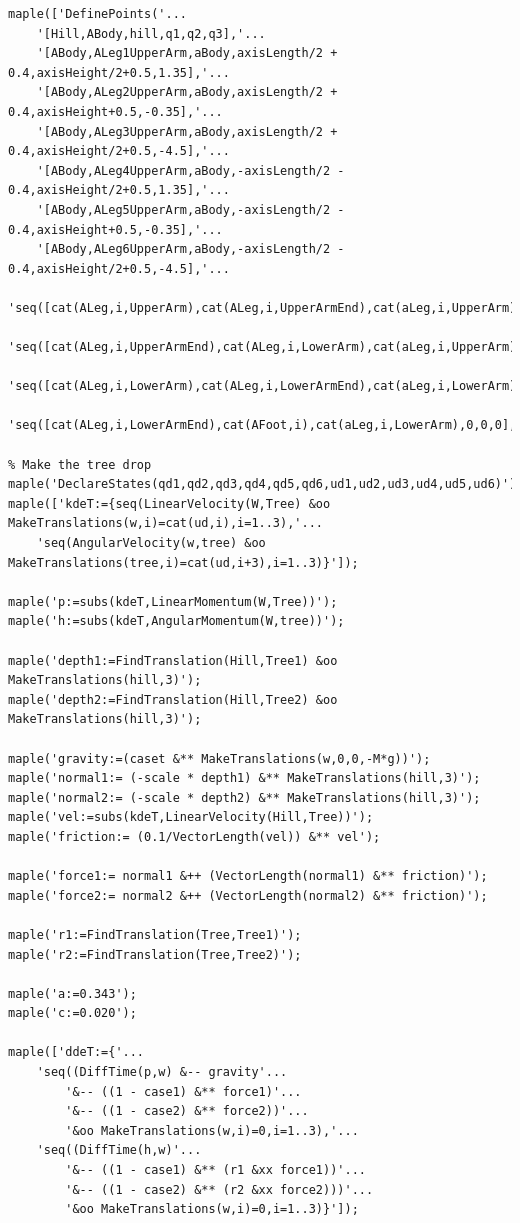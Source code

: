\documentclass{article}
\begin{document}
\begin{verbatim}
maple(['DefinePoints('...
	'[Hill,ABody,hill,q1,q2,q3],'...
	'[ABody,ALeg1UpperArm,aBody,axisLength/2 + 0.4,axisHeight/2+0.5,1.35],'...
	'[ABody,ALeg2UpperArm,aBody,axisLength/2 + 0.4,axisHeight+0.5,-0.35],'...
	'[ABody,ALeg3UpperArm,aBody,axisLength/2 + 0.4,axisHeight/2+0.5,-4.5],'...
	'[ABody,ALeg4UpperArm,aBody,-axisLength/2 - 0.4,axisHeight/2+0.5,1.35],'...
	'[ABody,ALeg5UpperArm,aBody,-axisLength/2 - 0.4,axisHeight+0.5,-0.35],'...
	'[ABody,ALeg6UpperArm,aBody,-axisLength/2 - 0.4,axisHeight/2+0.5,-4.5],'...
	'seq([cat(ALeg,i,UpperArm),cat(ALeg,i,UpperArmEnd),cat(aLeg,i,UpperArm),0,0,LengthUpperArm],i=1..6),'...
	'seq([cat(ALeg,i,UpperArmEnd),cat(ALeg,i,LowerArm),cat(aLeg,i,UpperArm),0,0,0],i=1..6),'...
	'seq([cat(ALeg,i,LowerArm),cat(ALeg,i,LowerArmEnd),cat(aLeg,i,LowerArm),0,0,LengthLowerArm],i=1..6),'...
	'seq([cat(ALeg,i,LowerArmEnd),cat(AFoot,i),cat(aLeg,i,LowerArm),0,0,0],i=1..6))']);

% Make the tree drop
maple('DeclareStates(qd1,qd2,qd3,qd4,qd5,qd6,ud1,ud2,ud3,ud4,ud5,ud6)');
maple(['kdeT:={seq(LinearVelocity(W,Tree) &oo MakeTranslations(w,i)=cat(ud,i),i=1..3),'...
    'seq(AngularVelocity(w,tree) &oo MakeTranslations(tree,i)=cat(ud,i+3),i=1..3)}']);

maple('p:=subs(kdeT,LinearMomentum(W,Tree))');
maple('h:=subs(kdeT,AngularMomentum(W,tree))');

maple('depth1:=FindTranslation(Hill,Tree1) &oo MakeTranslations(hill,3)');
maple('depth2:=FindTranslation(Hill,Tree2) &oo MakeTranslations(hill,3)');

maple('gravity:=(caset &** MakeTranslations(w,0,0,-M*g))');
maple('normal1:= (-scale * depth1) &** MakeTranslations(hill,3)');
maple('normal2:= (-scale * depth2) &** MakeTranslations(hill,3)');
maple('vel:=subs(kdeT,LinearVelocity(Hill,Tree))');
maple('friction:= (0.1/VectorLength(vel)) &** vel');

maple('force1:= normal1 &++ (VectorLength(normal1) &** friction)');
maple('force2:= normal2 &++ (VectorLength(normal2) &** friction)');

maple('r1:=FindTranslation(Tree,Tree1)');
maple('r2:=FindTranslation(Tree,Tree2)');

maple('a:=0.343');
maple('c:=0.020');

maple(['ddeT:={'...
    'seq((DiffTime(p,w) &-- gravity'...
        '&-- ((1 - case1) &** force1)'...
        '&-- ((1 - case2) &** force2))'...
        '&oo MakeTranslations(w,i)=0,i=1..3),'...
    'seq((DiffTime(h,w)'...
        '&-- ((1 - case1) &** (r1 &xx force1))'...
        '&-- ((1 - case2) &** (r2 &xx force2)))'...
        '&oo MakeTranslations(w,i)=0,i=1..3)}']);


\end{verbatim}
\end{document}
